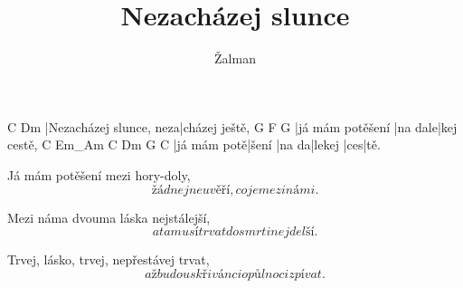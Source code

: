 \documentclass{song}
\title{Nezacházej slunce}
\author{Žalman}
\begin{document}
\strophe
C                       Dm
|Nezacházej slunce, neza|cházej ještě,
G                F       G
|já mám potěšení |na dale|kej cestě,
C           Em_Am C     Dm     G   C
|já mám potě|šení |na da|lekej |ces|tě.
\endstrophe

\strophe*
Já mám potěšení mezi hory-doly,
\[ žádnej neuvěří, co je mezi námi. \]
\endstrophe

\strophe*
Mezi náma dvouma láska nejstálejší,
\[ a ta musí trvat do smrti nejdelší. \]
\endstrophe

\strophe*
Trvej, lásko, trvej, nepřestávej trvat,
\[ až budou skřivánci o půlnoci zpívat. \]
\endstrophe
\end{document}
